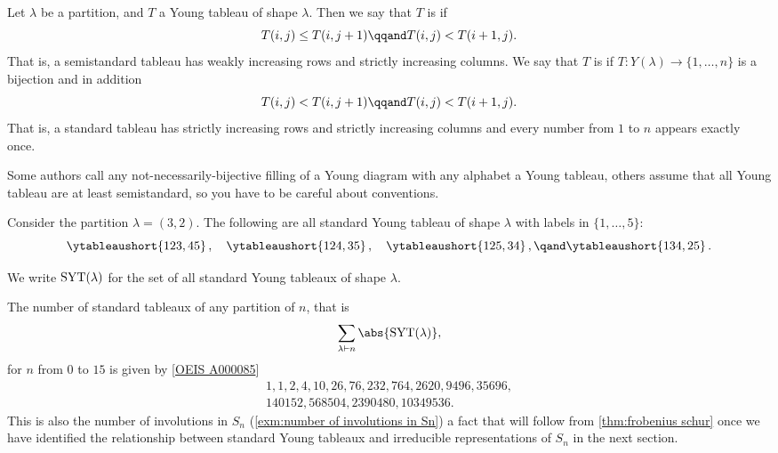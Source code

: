 \begin{dfn}{}{}
    Let \(\lambda\) be a partition, and \(T\) a Young tableau of shape \(\lambda\).
    Then we say that \(T\) is  if
    \begin{equation}
        T(i, j) \le T(i, j + 1) \qqand T(i, j) < T(i + 1, j).
    \end{equation}
    That is, a semistandard tableau has weakly increasing rows and strictly increasing columns.
    We say that \(T\) is  if \(T \colon Y(\lambda) \to \{1, \dotsc, n\}\) is a bijection and in addition
    \begin{equation}
        T(i, j) < T(i, j + 1) \qqand T(i, j) < T(i + 1, j).
    \end{equation}
    That is, a standard tableau has strictly increasing rows and strictly increasing columns and every number from \(1\) to \(n\) appears exactly once.
\end{dfn}

\begin{rmk}
    Some authors call any not-necessarily-bijective filling of a Young diagram with any alphabet a Young tableau, others assume that all Young tableau are at least semistandard, so you have to be careful about conventions.
\end{rmk}

Consider the partition \(\lambda = (3,2)\).
The following are all standard Young tableau of shape \(\lambda\) with labels in \(\{1, \dotsc, 5\}\):
\begin{equation}
    \ytableaushort{123,45}\,,\quad \ytableaushort{124,35}\,,\quad \ytableaushort{125,34}\,,\qand\ytableaushort{134,25}\,.
\end{equation}

\begin{ntn}{}{}
    We write \(\operatorname{SYT}(\lambda)\) for the set of all standard Young tableaux of shape \(\lambda\).
\end{ntn}

The number of standard tableaux of any partition of \(n\), that is
\begin{equation}
    \sum_{\lambda \partition n} \abs{\standardYoungTableaux(\lambda)},
\end{equation}
for \(n\) from \(0\) to \(15\) is given by [\hyperlink{https://oeis.org/A000085}{OEIS A000085}]
\begin{gather*}
    1, 1, 2, 4, 10, 26, 76, 232, 764, \num{2620}, \num{9496}, \num{35696},\\
    \num{140152}, \num{568504}, \num{2390480}, \num{10349536}.
\end{gather*}
This is also the number of involutions in \(S_n\) (\cref{exm:number of involutions in Sn}) a fact that will follow from \cref{thm:frobenius schur} once we have identified the relationship between standard Young tableaux and irreducible representations of \(S_n\) in the next section.

